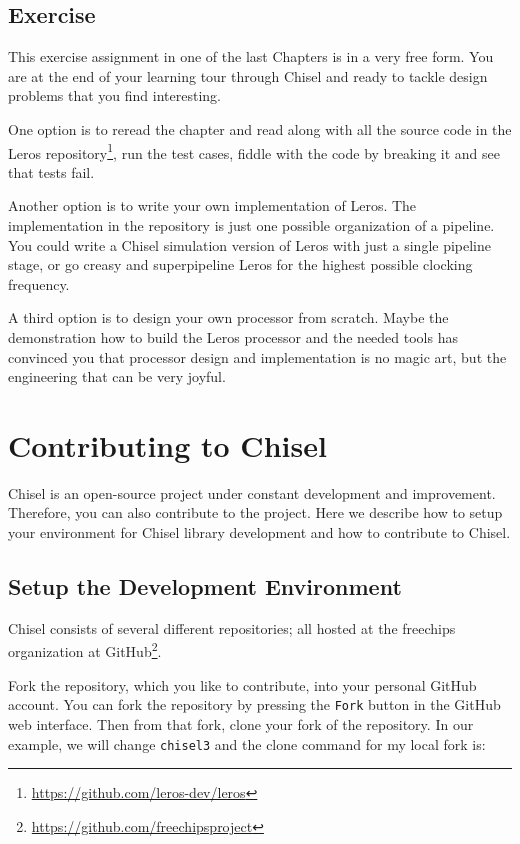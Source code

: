 \documentclass[%
    10pt,
    headinclude, footexclude,
    openright, %
    notitlepage,
    cleardoubleempty,
    headsepline,
    pointlessnumbers,
    bibtotoc, idxtotoc,
    ]{scrbook}
\newcommand{\code}[1]{{\small{\texttt{#1}}}}
\newcommand{\myref}[2]{\href{#1}{#2}}
\renewcommand{\myref}[2]{{#2}{\footnote{\url{#1}}}}
\begin{document}

\section{Exercise}

This exercise assignment in one of the last Chapters is in a very free form. You are at the end
of your learning tour through Chisel and ready to tackle design problems that
you find interesting.

One option is to reread the chapter and read along with all the source code in the
\myref{https://github.com/leros-dev/leros}{Leros repository}, run the test cases,
fiddle with the code by breaking it and see that tests fail.

Another option is to write your own implementation of Leros.
The implementation in the repository is just one possible organization of a pipeline.
You could write a Chisel simulation version of Leros with just a single pipeline stage,
or go creasy and superpipeline Leros for the highest possible clocking frequency.

A third option is to design your own processor from scratch. Maybe the demonstration
how to build the Leros processor and the needed tools has convinced you that processor
design and implementation is no magic art, but the engineering that can be very joyful.

\chapter{Contributing to Chisel}

Chisel is an open-source project under constant development and improvement.
Therefore, you can also contribute to the project. Here we describe how to
setup your environment for Chisel library development and how to contribute
to Chisel.

\section{Setup the Development Environment}

Chisel consists of several different repositories; all hosted at
the \myref{https://github.com/freechipsproject}{freechips organization at GitHub}.

Fork the repository, which you like to contribute, into your personal GitHub account.
You can fork the repository by pressing the \code{Fork} button in the GitHub web interface.
Then from that fork, clone your fork of the repository. In our example, we will change
\code{chisel3} and the clone command for my local fork is:
\end{document}
